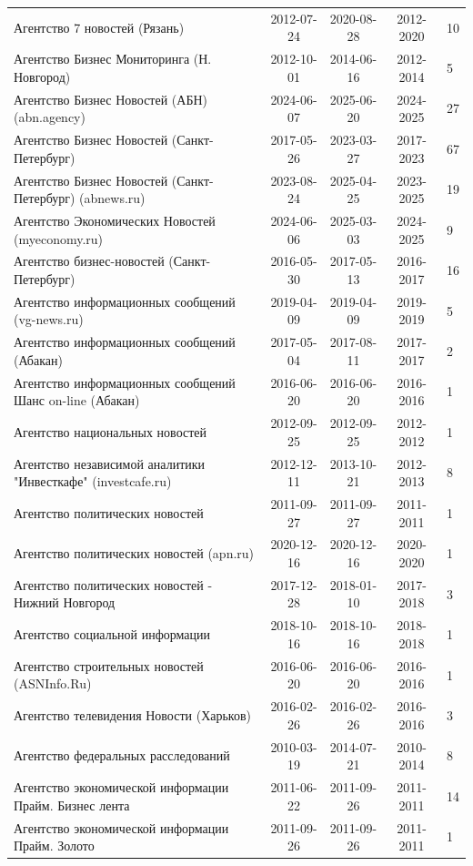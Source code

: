 \begin{longtable}{p{6cm}cccp{2cm}}
Агентство 7 новостей (Рязань) & 2012-07-24 & 2020-08-28 & 2012-2020 & 10\\
Агентство Бизнес Мониторинга (Н. Новгород) & 2012-10-01 & 2014-06-16 & 2012-2014 & 5\\
Агентство Бизнес Новостей (АБН) (abn.agency) & 2024-06-07 & 2025-06-20 & 2024-2025 & 27\\
Агентство Бизнес Новостей (Санкт-Петербург) & 2017-05-26 & 2023-03-27 & 2017-2023 & 67\\
Агентство Бизнес Новостей (Санкт-Петербург) (abnews.ru) & 2023-08-24 & 2025-04-25 & 2023-2025 & 19\\
Агентство Экономических Новостей (myeconomy.ru) & 2024-06-06 & 2025-03-03 & 2024-2025 & 9\\
Агентство бизнес-новостей (Санкт-Петербург) & 2016-05-30 & 2017-05-13 & 2016-2017 & 16\\
Агентство информационных сообщений (vg-news.ru) & 2019-04-09 & 2019-04-09 & 2019-2019 & 5\\
Агентство информационных сообщений (Абакан) & 2017-05-04 & 2017-08-11 & 2017-2017 & 2\\
Агентство информационных сообщений Шанс on-line (Абакан) & 2016-06-20 & 2016-06-20 & 2016-2016 & 1\\
Агентство национальных новостей & 2012-09-25 & 2012-09-25 & 2012-2012 & 1\\
Агентство независимой аналитики "Инвесткафе" (investcafe.ru) & 2012-12-11 & 2013-10-21 & 2012-2013 & 8\\
Агентство политических новостей & 2011-09-27 & 2011-09-27 & 2011-2011 & 1\\
Агентство политических новостей (apn.ru) & 2020-12-16 & 2020-12-16 & 2020-2020 & 1\\
Агентство политических новостей - Нижний Новгород & 2017-12-28 & 2018-01-10 & 2017-2018 & 3\\
Агентство социальной информации & 2018-10-16 & 2018-10-16 & 2018-2018 & 1\\
Агентство строительных новостей (ASNInfo.Ru) & 2016-06-20 & 2016-06-20 & 2016-2016 & 1\\
Агентство телевидения Новости (Харьков) & 2016-02-26 & 2016-02-26 & 2016-2016 & 3\\
Агентство федеральных расследований & 2010-03-19 & 2014-07-21 & 2010-2014 & 8\\
Агентство экономической информации Прайм. Бизнес лента & 2011-06-22 & 2011-09-26 & 2011-2011 & 14\\
Агентство экономической информации Прайм. Золото & 2011-09-26 & 2011-09-26 & 2011-2011 & 1\\

\end{longtable}
